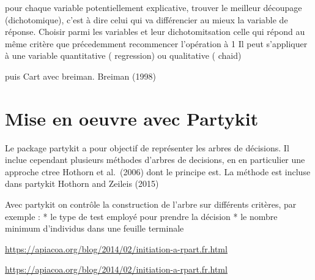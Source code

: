 \documentclass[
]{book}
\begin{document}
pour chaque variable potentiellement explicative, trouver le meilleur découpage (dichotomique), c'est à dire celui qui va différencier au mieux la variable de réponse.
Choisir parmi les variables et leur dichotomitsation celle qui répond au même critère que précedemment
recommencer l'opération à 1
Il peut s'appliquer à une variable quantitative ( regression) ou qualitative ( chaid)

puis Cart avec breiman. Breiman (1998)

\hypertarget{mise-en-oeuvre-avec-partykit}{%
\section{Mise en oeuvre avec Partykit}\label{mise-en-oeuvre-avec-partykit}}

Le package partykit a pour objectif de représenter les arbres de décisions. Il inclue cependant plusieurs méthodes d'arbres de decisions, en en particulier une approche ctree Hothorn et al.~(2006) dont le principe est. La méthode est incluse dans partykit Hothorn and Zeileis (2015)

Avec partykit on contrôle la construction de l'arbre sur différents critères, par exemple : * le type de test employé pour prendre la décision * le nombre minimum d'individus dans une feuille terminale

\url{https://apiacoa.org/blog/2014/02/initiation-a-rpart.fr.html}

\url{https://apiacoa.org/blog/2014/02/initiation-a-rpart.fr.html}
\end{document}
